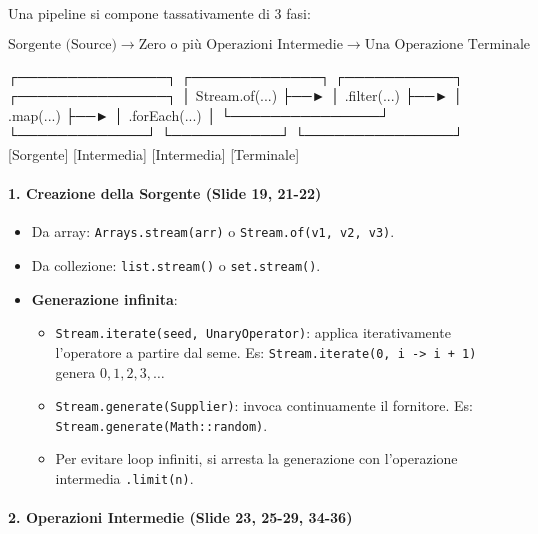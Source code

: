 \documentclass[11pt,a4paper]{article}
\newcommand{\passthrough}[1]{#1}
\providecommand{\tightlist}{\setlength{\itemsep}{0pt}\setlength{\parskip}{0pt}}
\begin{document}
Una pipeline si compone tassativamente di 3 fasi:

\[\text{Sorgente (Source)} \longrightarrow \text{Zero o più Operazioni Intermedie} \longrightarrow \text{Una Operazione Terminale}\]

\needspace{7cm}
\begin{asciibox}
┌───────────────┐     ┌─────────────┐     ┌───────────┐     ┌───────────────┐
│ Stream.of(...) ├──► │ .filter(...) ├──► │ .map(...) ├──►  │ .forEach(...) │
└───────────────┘     └─────────────┘     └───────────┘     └───────────────┘
   [Sorgente]          [Intermedia]        [Intermedia]        [Terminale]
\end{asciibox}

\paragraph{1. Creazione della Sorgente (Slide 19,
21-22)}\label{creazione-della-sorgente-slide-19-21-22}

\begin{itemize}
\tightlist
\item
  Da array: \passthrough{\lstinline!Arrays.stream(arr)!} o
  \passthrough{\lstinline!Stream.of(v1, v2, v3)!}.
\item
  Da collezione: \passthrough{\lstinline!list.stream()!} o
  \passthrough{\lstinline!set.stream()!}.
\item
  \textbf{Generazione infinita}:

  \begin{itemize}
  \tightlist
  \item
    \passthrough{\lstinline!Stream.iterate(seed, UnaryOperator)!}:
    applica iterativamente l'operatore a partire dal seme. Es:
    \passthrough{\lstinline!Stream.iterate(0, i -> i + 1)!} genera
    \(0, 1, 2, 3, \dots\)
  \item
    \passthrough{\lstinline!Stream.generate(Supplier)!}: invoca
    continuamente il fornitore. Es:
    \passthrough{\lstinline!Stream.generate(Math::random)!}.
  \item
    Per evitare loop infiniti, si arresta la generazione con
    l'operazione intermedia \passthrough{\lstinline!.limit(n)!}.
  \end{itemize}
\end{itemize}

\paragraph{2. Operazioni Intermedie (Slide 23, 25-29,
34-36)}\label{operazioni-intermedie-slide-23-25-29-34-36}
\end{document}
